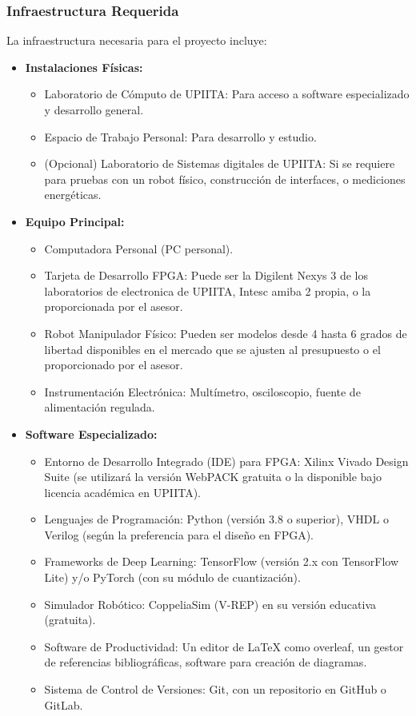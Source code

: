 \documentclass[12pt]{article}
\begin{document}
\subsubsection{Infraestructura Requerida}
\label{sssec:infraestructura_requerida_listas}
La infraestructura necesaria para el proyecto incluye:

\begin{itemize}
    \item \textbf{Instalaciones Físicas:}
        \begin{itemize}
            \item Laboratorio de Cómputo de UPIITA: Para acceso a software especializado y desarrollo general.
            \item Espacio de Trabajo Personal: Para desarrollo y estudio.
            \item (Opcional) Laboratorio de Sistemas digitales de UPIITA: Si se requiere para pruebas con un robot físico, construcción de interfaces, o mediciones energéticas.
        \end{itemize}
    \item \textbf{Equipo Principal:}
        \begin{itemize}
            \item Computadora Personal (PC personal).
            \item Tarjeta de Desarrollo FPGA: Puede ser la Digilent Nexys 3 de los laboratorios de electronica de UPIITA, Intesc amiba 2 propia, o la proporcionada por el asesor.
            \item Robot Manipulador Físico: Pueden ser modelos desde 4 hasta 6 grados de libertad disponibles en el mercado que se ajusten al presupuesto o el proporcionado por el asesor.
            \item Instrumentación Electrónica: Multímetro, osciloscopio, fuente de alimentación regulada.
        \end{itemize}
    \item \textbf{Software Especializado:}
        \begin{itemize}
            \item Entorno de Desarrollo Integrado (IDE) para FPGA: Xilinx Vivado Design Suite (se utilizará la versión WebPACK gratuita o la disponible bajo licencia académica en UPIITA).
            \item Lenguajes de Programación: Python (versión 3.8 o superior), VHDL o Verilog (según la preferencia para el diseño en FPGA).
            \item Frameworks de Deep Learning: TensorFlow (versión 2.x con TensorFlow Lite) y/o PyTorch (con su módulo de cuantización).
            \item Simulador Robótico: CoppeliaSim (V-REP) en su versión educativa (gratuita).
            \item Software de Productividad: Un editor de LaTeX como overleaf, un gestor de referencias bibliográficas, software para creación de diagramas.
            \item Sistema de Control de Versiones: Git, con un repositorio en GitHub o GitLab.
        \end{itemize}
\end{itemize}
\end{document}
